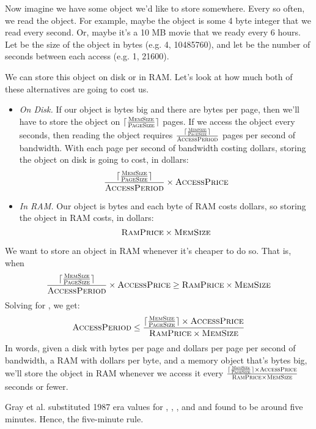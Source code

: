 \documentclass[12pt]{article}
\DeclarePairedDelimiter{\ceil}{\lceil}{\rceil}
\newcommand{\emf}[1]{\textcolor{berkgoldalt}{#1}}
\begin{document}
Now imagine we have some object we'd like to store somewhere. Every so often,
we read the object. For example, maybe the object is some 4 byte integer that
we read every second. Or, maybe it's a 10 MB movie that we ready every 6 hours.
Let \emf{\memsize{}} be the size of the object in bytes (e.g. 4, 10485760), and
let \emf{\accessperiod{}} be the number of seconds between each access (e.g. 1,
21600).

We can store this object on disk or in RAM. Let's look at how much both of
these alternatives are going to cost us.

\newcommand{\numpages}{\ceil{\frac{\memsize}{\pagesize}}}
\begin{itemize}
  \item \emph{On Disk.}
    If our object is \memsize{} bytes big and there are \pagesize{} bytes per
    page, then we'll have to store the object on $\numpages$ pages. If we
    access the object every \accessperiod{} seconds, then reading the object
    requires $\frac{\numpages}{\accessperiod}$ pages per second of bandwidth.
    With each page per second of bandwidth costing \accessprice{} dollars,
    storing the object on disk is going to cost, in dollars:
    \[
      \frac{\numpages}{\accessperiod} \times \accessprice
    \]
  \item \emph{In RAM.}
    Our object is \memsize{} bytes and each byte of RAM costs \ramprice{}
    dollars, so storing the object in RAM costs, in dollars:
    \[
      \textsc{RamPrice} \times \textsc{MemSize}
    \]
\end{itemize}

We want to store an object in RAM whenever it's cheaper to do so. That is, when
\[
  \frac{\numpages}{\accessperiod} \times \accessprice
  \geq
  \ramprice \times \memsize
\]
Solving for \accessperiod{}, we get:
\[
  \accessperiod
  \leq
  \frac{\numpages \times \accessprice}{\ramprice \times \memsize}
\]
In words, given a disk with \pagesize{} bytes per page and \accessprice{}
dollars per page per second of bandwidth, a RAM with \ramprice{} dollars per
byte, and a memory object that's \memsize{} bytes big, we'll store the object
in RAM whenever we access it every
$\frac{\numpages \times \accessprice}{\ramprice \times \memsize}$
seconds or fewer.

Gray et al. substituted 1987 era values for \pagesize{}, \accessprice{},
\ramprice{}, and \memsize{} and found \accessperiod to be around five minutes.
Hence, the five-minute rule.
\end{document}
